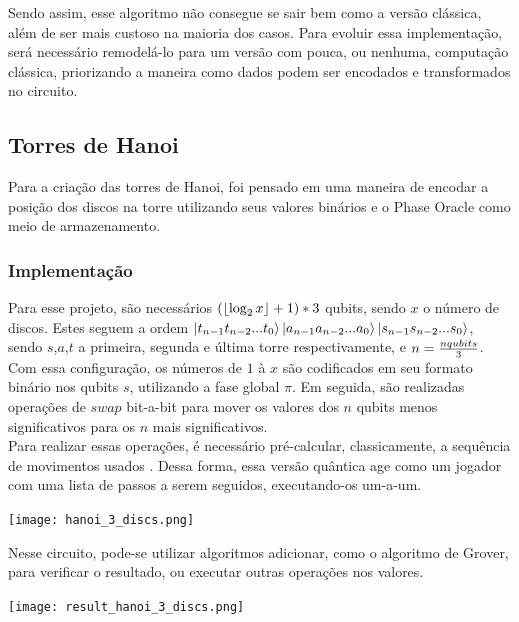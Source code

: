 \documentclass{article}
\DeclarePairedDelimiter\floor{\lfloor}{\rfloor}
\begin{document}
Sendo assim, esse algoritmo não consegue se sair bem como a versão clássica, além de ser mais custoso na maioria dos casos. Para evoluir essa implementação, será necessário remodelá-lo para um versão com pouca, ou nenhuma, computação clássica, priorizando a maneira como dados podem ser encodados e transformados no circuito.

\subsection{Torres de Hanoi} \label{hanoi}
Para a criação das torres de Hanoi, foi pensado em uma maneira de encodar a posição dos discos na torre utilizando seus valores binários e o Phase Oracle como meio de armazenamento.

\subsubsection{Implementação}
Para esse projeto, são necessários $(\floor{\log_2{x}} + 1) * 3$ qubits, sendo $x$ o número de discos. Estes seguem a ordem $\ket{t_{n-1} t_{n-2} ... t_0}\ket{a_{n-1} a_{n-2} ... a_0}\ket{s_{n-1} s_{n-2} ... s_0}$, sendo $s$,$a$,$t$ a primeira, segunda e última torre respectivamente, e $n = {{n \space qubits} \over 3}$.\\
Com essa configuração, os números de $1$ à $x$ são codificados em seu formato binário nos qubits $s$, utilizando a fase global $\pi$. Em seguida, são realizadas operações de $swap$ bit-a-bit para mover os valores dos $n$ qubits menos significativos para os $n$ mais significativos.\\
Para realizar essas operações, é necessário pré-calcular, classicamente, a sequência de movimentos usados  \cite{ldiaandr_2021_tower} \cite{diptokarmakar47_2019_how} \cite{a2020_towers}  \cite{geeksforgeeks_2014_program}. Dessa forma, essa versão quântica age como um jogador com uma lista de passos a serem seguidos, executando-os um-a-um.

\begin{center}
	\texttt{[image: hanoi\_3\_discs.png]}
	\label{fig:hanoi}
\end{center}

Nesse circuito, pode-se utilizar algoritmos adicionar, como o algoritmo de Grover, para verificar o resultado, ou executar outras operações nos valores.

\begin{center}
	\texttt{[image: result\_hanoi\_3\_discs.png]}
	\label{fig:hanoi-result}
\end{center}
\end{document}
